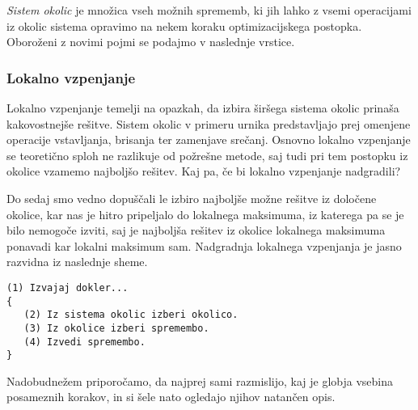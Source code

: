 \documentclass[10pt, a4paper]{article}
\begin{document}
\emph{Sistem okolic} je množica vseh možnih sprememb, ki jih lahko z vsemi operacijami iz
okolic sistema opravimo na nekem koraku optimizacijskega postopka. Oboroženi z novimi pojmi
se podajmo v naslednje vrstice.

\subsubsection{Lokalno vzpenjanje}

Lokalno vzpenjanje temelji na opazkah, da izbira širšega sistema okolic prinaša kakovostnejše
rešitve. Sistem okolic v primeru urnika predstavljajo prej omenjene operacije vstavljanja,
brisanja ter zamenjave srečanj. Osnovno lokalno vzpenjanje se teoretično sploh ne razlikuje
od požrešne metode, saj tudi pri tem postopku iz okolice vzamemo najboljšo rešitev. Kaj pa,
če bi lokalno vzpenjanje nadgradili?

Do sedaj smo vedno dopuščali le izbiro najboljše možne rešitve iz določene okolice, kar nas
je hitro pripeljalo do lokalnega maksimuma, iz katerega pa se je bilo nemogoče izviti, saj
je najboljša rešitev iz okolice lokalnega maksimuma ponavadi kar lokalni maksimum sam.
Nadgradnja lokalnega vzpenjanja je jasno razvidna iz naslednje sheme.

\begin{verbatim}
(1) Izvajaj dokler...
{
   (2) Iz sistema okolic izberi okolico.
   (3) Iz okolice izberi spremembo.
   (4) Izvedi spremembo.
}
\end{verbatim}

\noindent Nadobudnežem priporočamo, da najprej sami razmislijo, kaj je globja vsebina posameznih
korakov, in si šele nato ogledajo njihov natančen opis.
\end{document}
